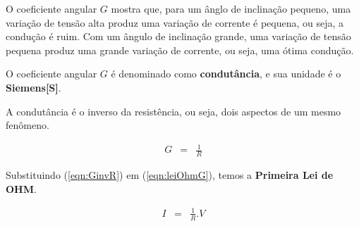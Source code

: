 O coeficiente angular $G$ mostra que, para um ânglo de inclinação pequeno, uma variação de tensão alta produz uma variação de corrente é pequena, ou seja, a condução é ruim. Com um ângulo de inclinação grande, uma variação de tensão pequena produz uma grande variação de corrente, ou seja, uma ótima condução.

O coeficiente angular $G$ é denominado como \textbf{condutância}, e sua unidade é o \textbf{Siemens[S]}.

A condutância é o inverso da resistência, ou seja, dois aspectos de um mesmo fenômeno.

\begin{eqnarray}
  \label{eqn:GinvR}
  G & = & \frac{1}{R}
\end{eqnarray}

Substituindo (\ref{eqn:GinvR}) em (\ref{eqn:leiOhmG}), temos a \textbf{Primeira Lei de OHM}.

\begin{eqnarray}
  \label{eqn:leiOhmR}
  I & = & \frac{1}{R} . V
\end{eqnarray}
